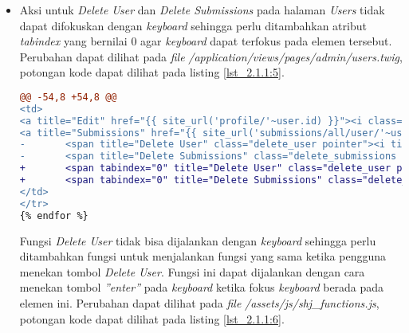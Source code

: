 \begin{itemize}
\begin{lstlisting}[language=diff, caption=Perubahan pada \textit{file} \textit{shj\_functions.js}, label=lst_2.1.1:4, basicstyle=\ttfamily, frame=single,
columns=fullflexible, keepspaces=true, breaklines=true]
@@ -352,6 +362,11 @@ 
$(document).ready(function () {
},
selector: '.top_object.shj_menu'
});
+ 	$(".select_assignment").on('keyup', function (e) {
+ 		if(e.which==13){
+ 			$(this).trigger("click");
+ 		}
+ 	})
$(".select_assignment").click(
function () {
var id = $(this).children('i').addBack('i').data('id');
\end{lstlisting}
	
	\item Aksi untuk \textit{Delete User} dan \textit{Delete Submissions} pada halaman \textit{Users} tidak dapat difokuskan dengan \textit{keyboard} sehingga perlu ditambahkan atribut \textit{tabindex} yang bernilai 0 agar \textit{keyboard} dapat terfokus pada elemen tersebut. Perubahan dapat dilihat pada \textit{file} \textit{/application/views/pages/admin/users.twig}, potongan kode dapat dilihat pada listing \ref{lst_2.1.1:5}.
	
\begin{lstlisting}[language=diff, caption=Perubahan pada \textit{file} \textit{users.twig}, label=lst_2.1.1:5, basicstyle=\ttfamily, frame=single,
columns=fullflexible, keepspaces=true, breaklines=true]
@@ -54,8 +54,8 @@
<td>
<a title="Edit" href="{{ site_url('profile/'~user.id) }}"><i class="fa fa-pencil fa-lg color9"></i></a>
<a title="Submissions" href="{{ site_url('submissions/all/user/'~user.username) }}"><i class="fa fa-bars fa-lg color12"></i></a>
- 		<span title="Delete User" class="delete_user pointer"><i title="Delete User" class="fa fa-times fa-lg color2"></i></span>
- 		<span title="Delete Submissions" class="delete_submissions pointer"><i class="fa fa-times-circle fa-lg color1"></i></span>
+ 		<span tabindex="0" title="Delete User" class="delete_user pointer"><i title="Delete User" class="fa fa-times fa-lg color2"></i></span>
+ 		<span tabindex="0" title="Delete Submissions" class="delete_submissions pointer"><i class="fa fa-times-circle fa-lg color1"></i></span>
</td>
</tr>
{% endfor %}
\end{lstlisting}

	Fungsi \textit{Delete User} tidak bisa dijalankan dengan \textit{keyboard} sehingga perlu ditambahkan fungsi untuk menjalankan fungsi yang sama ketika pengguna menekan tombol \textit{Delete User}. Fungsi ini dapat dijalankan dengan cara menekan tombol \textit{''enter''} pada \textit{keyboard} ketika fokus \textit{keyboard} berada pada elemen ini. Perubahan dapat dilihat pada \textit{file} \textit{/assets/js/shj\_functions.js}, potongan kode dapat dilihat pada listing \ref{lst_2.1.1:6}.
	

\end{itemize}
